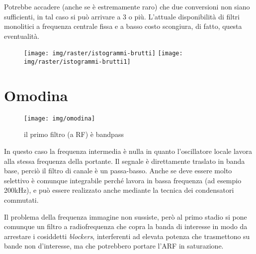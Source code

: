 Potrebbe accadere (anche se è estremamente raro) che due conversioni non siano sufficienti, in tal
caso si può arrivare a 3 o più. L'attuale disponibilità di filtri monolitici a frequenza centrale fissa e a
basso costo scongiura, di fatto, questa eventualità.

\begin{figure}[htb]
	\centering
	\texttt{[image: img/raster/istogrammi-brutti]}
	\hspace{2em}
	\texttt{[image: img/raster/istogrammi-brutti1]}
	\caption{}
	\label{fig:istogrammi-brutti1}
\end{figure}

\section{Omodina}
\begin{figure}[ht]
	\centering
	\texttt{[image: img/omodina]}
	\caption{il primo filtro (a RF) è bandpass}
	\label{fig:omodina}
\end{figure}
In questo caso la frequenza intermedia è nulla in quanto l'oscillatore locale lavora alla stessa frequenza della portante.
Il segnale è direttamente traslato in banda base, perciò il filtro di canale è un passa-basso. Anche se deve essere molto selettivo è comunque integrabile perché lavora in bassa frequenza (ad esempio 200kHz), e può essere realizzato anche mediante la tecnica dei condensatori commutati.

Il problema della frequenza immagine non sussiste, però al primo stadio si pone comunque un filtro a radiofrequenza che copra la banda di interesse in modo da arrestare i cosiddetti \textit{blockers}, interferenti ad elevata potenza che trasmettono su bande non d'interesse, ma che potrebbero portare l'ARF in saturazione.

